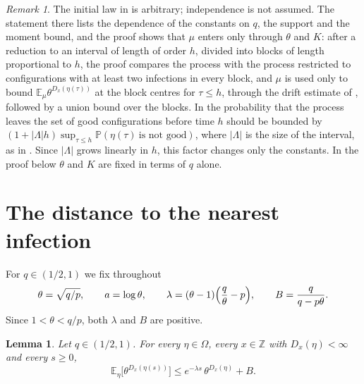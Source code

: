 \documentclass[11pt]{amsart}
\newtheorem{lemma}[theorem]{Lemma}
\theoremstyle{remark}
\newtheorem{remark}[theorem]{Remark}
\newcommand{\PP}{\mathbb{P}}
\newcommand{\E}{\mathbb{E}}
\newcommand{\Z}{\mathbb{Z}}
\begin{document}
\begin{remark}\label{rem:bcmrt}
The initial law in \cite{BCMRT13} is arbitrary; independence is not assumed. The statement there lists the
dependence of the constants on $q$, the support and the moment bound, and the proof shows that $\mu$ enters only
through $\theta$ and $K$: after a reduction to an interval of length of order $h$, divided into blocks of length
proportional to $h$, the proof compares the process with the process restricted to configurations with at least
two infections in every block, and $\mu$ is used only to bound $\E_\mu\theta^{D_x(\eta(\tau))}$ at the block centres for
$\tau\le h$, through the drift estimate of \cite[Proposition~4.1]{BCMRT13}, followed by a union bound over the blocks. In
\cite[Section~3.2]{BCMRT13} the probability that the process leaves the set of good configurations before time $h$
should be bounded by $(1+|\Lambda|h)\sup_{\tau\le h}\PP(\eta(\tau)\ \text{is not good})$, where $|\Lambda|$ is the size of
the interval, as in \cite[Section~3]{BDT19}. Since $|\Lambda|$ grows linearly in $h$, this factor changes only the
constants. In the proof below $\theta$ and $K$ are fixed in terms of $q$ alone.
\end{remark}

\section{The distance to the nearest infection}\label{sec:drift}

For $q\in(1/2,1)$ we fix throughout
\begin{equation}\label{eq:constants}
\theta=\sqrt{q/p},\qquad a=\log\theta,\qquad \lambda=(\theta-1)\Bigl(\frac q\theta-p\Bigr),\qquad
B=\frac{q}{q-p\theta}.
\end{equation}
Since $1<\theta<q/p$, both $\lambda$ and $B$ are positive.

\begin{lemma}\label{lem:drift}
Let $q\in(1/2,1)$. For every $\eta\in\Omega$, every $x\in\Z$ with $D_x(\eta)<\infty$ and every $s\ge0$,
\begin{equation}\label{eq:drift}
\E_\eta\bigl[\theta^{D_x(\eta(s))}\bigr]\le e^{-\lambda s}\,\theta^{D_x(\eta)}+B.
\end{equation}
\end{lemma}
\end{document}
